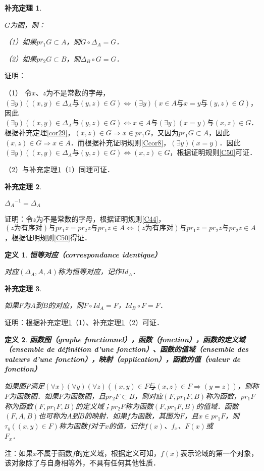 \documentclass[12pt, a4paper, oneside]{book}
\newtheorem{cor}{补充定理}
\newtheorem{de}{定义}
\begin{document}
			\begin{cor}\label{cor60}
				\hfill\par
				$G$为图，则：
				\par
				（1）如果$pr_1G\subset A$，则$G\circ \Delta_A=G$．
				\par
				（2）如果$pr_2G\subset B$，则$\Delta_B\circ G=G$．
			\end{cor}
			证明：
			\par
			（1）	令$x$、$z$为不是常数的字母，$(\exists y)((x, y)\in \Delta_A\text{与}(y, z)\in G)\Leftrightarrow (\exists y)(x\in A\text{与}x=y\text{与}(y, z)\in G)$，因此$(\exists y)((x, y)\in \Delta_A\text{与}(y, z)\in G)\Leftrightarrow x\in A\text{与}(\exists y)(x=y)\text{与}(x, z)\in G$．根据补充定理\ref{cor29}，$(x, z)\in G\Rightarrow x\in pr_1G$，又因为$pr_1G\subset A$，因此$(x, z)\in G\Rightarrow x\in A$．而根据补充证明规则\ref{Ccor8}，$(\exists y)(x=y)$．因此$(\exists y)((x, y)\in \Delta_A\text{与}(y, z)\in G)\Leftrightarrow (x, z)\in G$，根据证明规则\ref{C50}可证．
			\par
			（2）与补充定理\ref{cor60}（1）同理可证．
			
			\begin{cor}\label{cor61}
				\hfill\par
				${\Delta_A}^{-1}=\Delta_A$
			\end{cor}
			证明：令$z$为不是常数的字母，根据证明规则\ref{C44}，$(z\text{为有序对})\text{与}pr_1z=pr_2z\text{与}pr_1z\in A\Leftrightarrow (z\text{为有序对})\text{与}pr_1z=pr_2z\text{与}pr_2z\in A$，根据证明规则\ref{C50}得证．

			\begin{de}
				\textbf{恒等对应（correspondance identique）}
				\par
				对应$(\Delta_A, A, A)$称为恒等对应，记作$Id_A$．
			\end{de}
			
			\begin{cor}\label{cor62}
				\hfill\par
				如果$F$为$A$到$B$的对应，则$F\circ Id_A=F$，$Id_B\circ F=F$．
			\end{cor}
			证明：根据补充定理\ref{cor60}（1）、补充定理\ref{cor60}（2）可证．

			\begin{de}
				\textbf{函数图（graphe fonctionnel），函数（fonction），函数的定义域（ensemble de définition d'une fonction）、函数的值域（ensemble des valeurs d'une fonction），映射（application），函数的值（valeur de fonction）}
				\par
				如果图F满足$(\forall x)(\forall y)(\forall z)((x, y)\in F\text{与}(x, z)\in F\Rightarrow (y=z))$，则称$F$为函数图．如果$F$为函数图，且$pr_2F\subset B$，则对应$(F, pr_1F, B)$称为函数，$pr_1F$称为函数$(F, pr_1F, B)$的定义域；$pr_2F$称为函数$(F, pr_1F, B)$的值域．函数$(F, A, B)$也可称为$A$到$B$的映射．如果$f$为函数，其图为$F$，且$x\in pr_1F$，则$\tau_y((x, y)\in F)$称为函数$f$对于$x$的值，记作$f(x)$、$f_x$、$F(x)$或\\$F_x$．
			\end{de}
			注：如果$x$不属于函数$f$的定义域，根据定义可知，$f(x)$表示论域的第一个对象，该对象除了与自身相等外，不具有任何其他性质．
			
\end{document}
